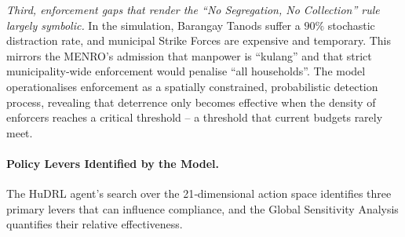 \emph{Third, enforcement gaps that render the “No Segregation, No Collection” rule largely symbolic.} In the simulation, Barangay Tanods suffer a \(90\%\) stochastic distraction rate, and municipal Strike Forces are expensive and temporary. This mirrors the MENRO’s admission that manpower is “kulang” and that strict municipality‑wide enforcement would penalise “all households”. The model operationalises enforcement as a spatially constrained, probabilistic detection process, revealing that deterrence only becomes effective when the density of enforcers reaches a critical threshold – a threshold that current budgets rarely meet.

\paragraph{Policy Levers Identified by the Model.}
The HuDRL agent’s search over the 21‑dimensional action space identifies three primary levers that can influence compliance, and the Global Sensitivity Analysis quantifies their relative effectiveness.


